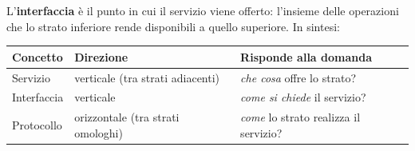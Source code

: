L'\textbf{interfaccia} è il punto in cui il servizio viene offerto: l'insieme delle operazioni che
lo strato inferiore rende disponibili a quello superiore. In sintesi:

\begin{center}
\begin{tabular}{lll}
\toprule
\textbf{Concetto} & \textbf{Direzione} & \textbf{Risponde alla domanda} \\
\midrule
Servizio & verticale (tra strati adiacenti) & \emph{che cosa} offre lo strato? \\
Interfaccia & verticale & \emph{come si chiede} il servizio? \\
Protocollo & orizzontale (tra strati omologhi) & \emph{come} lo strato realizza il servizio? \\
\bottomrule
\end{tabular}
\end{center}



